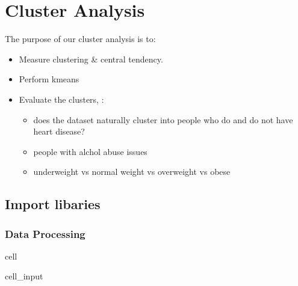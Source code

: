 \documentclass[letterpaper,10pt,english]{jupyterBook}
\begin{document}
\sphinxstepscope


\chapter{Cluster Analysis}
\label{\detokenize{Clustering_Analysis:cluster-analysis}}\label{\detokenize{Clustering_Analysis::doc}}
\sphinxAtStartPar
The purpose of our cluster analysis is to:
\begin{itemize}
\item {} 
\sphinxAtStartPar
Measure clustering \& central tendency.

\item {} 
\sphinxAtStartPar
Perform k\sphinxhyphen{}means

\item {} 
\sphinxAtStartPar
Evaluate the clusters, :
\begin{itemize}
\item {} 
\sphinxAtStartPar
does the dataset naturally cluster into people who do and do not have heart disease?

\item {} 
\sphinxAtStartPar
people with alchol abuse issues

\item {} 
\sphinxAtStartPar
underweight vs normal weight vs overweight vs obese

\end{itemize}

\end{itemize}


\section{Import libaries}
\label{\detokenize{Clustering_Analysis:import-libaries}}

\subsection{Data Processing}
\label{\detokenize{Clustering_Analysis:data-processing}}
\begin{sphinxuseclass}{cell}\begin{sphinxVerbatimInput}

\begin{sphinxuseclass}{cell_input}
\begin{sphinxVerbatim}[commandchars=\\\{\}]
   
\end{sphinxVerbatim}

\end{sphinxuseclass}\end{sphinxVerbatimInput}

\end{sphinxuseclass}
\end{document}
